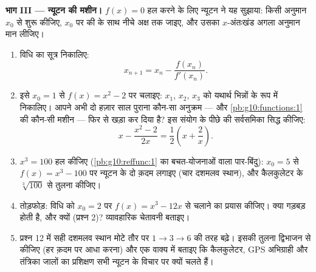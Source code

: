 \begin{problem}
\medskip
\noindent\textbf{भाग III --- न्यूटन की मशीन।}
$f(x) = 0$ हल करने के लिए न्यूटन ने यह सुझाया: किसी अनुमान $x_0$ से शुरू कीजिए,
$x_0$ पर की  के साथ नीचे अक्ष तक जाइए, और उसका $x$-अंतःखंड अगला
अनुमान मान लीजिए।
\begin{enumerate}[resume]
  \item विधि का सूत्र निकालिए:
        \[
        x_{n + 1} = x_n - \frac{f(x_n)}{f'(x_n)} .
        \]
  \item इसे $x_0 = 1$ से $f(x) = x^2 - 2$ पर चलाइए: $x_1$, $x_2$, $x_3$ को यथार्थ भिन्नों
        के रूप में निकालिए। आपने अभी दो हज़ार साल पुराना कौन-सा अनुक्रम ---
        और \cref{pb:g10:functions:1} की कौन-सी मशीन --- फिर से खड़ा कर दिया है? इस संयोग के
        पीछे की सर्वसमिका सिद्ध कीजिए:
        \[
        x - \frac{x^2 - 2}{2x} = \frac12\left(x +
        \frac2x\right).
        \]
  \item $x^3 = 100$ हल कीजिए (\cref{pb:g10:reffunc:1} का बचत-योजनाओं वाला पार-बिंदु): $x_0 = 5$ से
        $f(x) = x^3 - 100$ पर न्यूटन के दो क़दम लगाइए (चार दशमलव स्थान), और कैलकुलेटर के
        $\sqrt[3]{100}$ से तुलना कीजिए।
  \item तोड़फोड़: विधि को $x_0 = 2$ पर $f(x) = x^3 - 12x$ से चलाने का प्रयास कीजिए। क्या
        गड़बड़ होती है, और क्यों (प्रश्न 2)? व्यावहारिक चेतावनी बताइए।
  \item प्रश्न 12 में सही दशमलव स्थान मोटे तौर पर $1 \to 3 \to 6$ की तरह बढ़े। इसकी
        तुलना द्विभाजन से कीजिए (हर क़दम पर  आधा करना) और एक वाक्य में
        बताइए कि कैलकुलेटर, GPS अभिग्राही और तंत्रिका जालों का प्रशिक्षण
        सभी न्यूटन के विचार पर क्यों चलते हैं।
\end{enumerate}


\end{problem}

